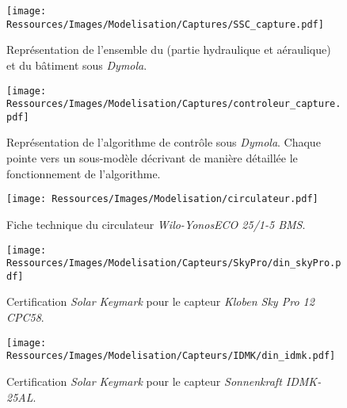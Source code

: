 
\begin{landscape}

\begin{figure}
    \centering
    \texttt{[image: Ressources/Images/Modelisation/Captures/SSC\_capture.pdf]}
    \caption[Représentation de l’ensemble du  et du bâtiment sous \textit{Dymola}]
            {Représentation de l’ensemble du  (partie hydraulique et aéraulique)
             et du bâtiment sous \textit{Dymola}.}
             \label{fig:dymola_ssc_batiment}
\end{figure}

\begin{figure}
    \centering
    \texttt{[image: Ressources/Images/Modelisation/Captures/controleur\_capture.pdf]}
    \caption[Représentation de l’algorithme de contrôle sous \textit{Dymola}]
            {Représentation de l’algorithme de contrôle sous \textit{Dymola}. Chaque 
             pointe vers un sous-modèle décrivant de manière détaillée le fonctionnement de l’algorithme.}
             \label{fig:dymola_ssc_controle}
\end{figure}

\end{landscape}


\begin{figure}
    \centering
    \texttt{[image: Ressources/Images/Modelisation/circulateur.pdf]}
    \caption[Fiche technique du circulateur \textit{Wilo-YonosECO 25/1-5 BMS}]
            {Fiche technique du circulateur \textit{Wilo-YonosECO 25/1-5 BMS}.}
    \label{fig:caracs_pompes}
\end{figure}

\begin{figure}
    \centering
    \texttt{[image: Ressources/Images/Modelisation/Capteurs/SkyPro/din\_skyPro.pdf]}
    \caption[Certification \textit{Solar Keymark} pour le capteur \textit{Kloben Sky Pro 12 CPC58}]
            {Certification \textit{Solar Keymark} pour le capteur \textit{Kloben Sky Pro 12 CPC58}.}
    \label{fig:caracs_skypro}
\end{figure}


\begin{figure}
    \centering
    \texttt{[image: Ressources/Images/Modelisation/Capteurs/IDMK/din\_idmk.pdf]}
    \caption[Certification \textit{Solar Keymark} pour le capteur \textit{Sonnenkraft IDMK-25AL}]
            {Certification \textit{Solar Keymark} pour le capteur \textit{Sonnenkraft IDMK-25AL}.}
    \label{fig:caracs_idmk}
\end{figure}


